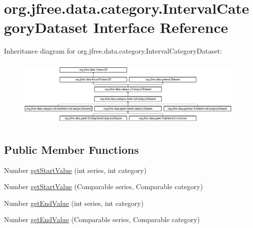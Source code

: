 \hypertarget{interfaceorg_1_1jfree_1_1data_1_1category_1_1_interval_category_dataset}{}\section{org.\+jfree.\+data.\+category.\+Interval\+Category\+Dataset Interface Reference}
\label{interfaceorg_1_1jfree_1_1data_1_1category_1_1_interval_category_dataset}
Inheritance diagram for org.\+jfree.\+data.\+category.\+Interval\+Category\+Dataset\+:\begin{figure}[H]
\begin{center}
\leavevmode
\includegraphics[height=3.383686cm]{interfaceorg_1_1jfree_1_1data_1_1category_1_1_interval_category_dataset}
\end{center}
\end{figure}
\subsection*{Public Member Functions}
\begin{DoxyCompactItemize}
\item 
Number \mbox{\hyperlink{interfaceorg_1_1jfree_1_1data_1_1category_1_1_interval_category_dataset_ab39752773cf77a5ccbbae7851fd16aa6}{get\+Start\+Value}} (int series, int category)
\item 
Number \mbox{\hyperlink{interfaceorg_1_1jfree_1_1data_1_1category_1_1_interval_category_dataset_aec932dc7f50bf72be26002494a266e2e}{get\+Start\+Value}} (Comparable series, Comparable category)
\item 
Number \mbox{\hyperlink{interfaceorg_1_1jfree_1_1data_1_1category_1_1_interval_category_dataset_af83cb9f655ea175391fed773b2e478cb}{get\+End\+Value}} (int series, int category)
\item 
Number \mbox{\hyperlink{interfaceorg_1_1jfree_1_1data_1_1category_1_1_interval_category_dataset_a2801c0f15eab2373ff828698f768a4b5}{get\+End\+Value}} (Comparable series, Comparable category)
\end{DoxyCompactItemize}


